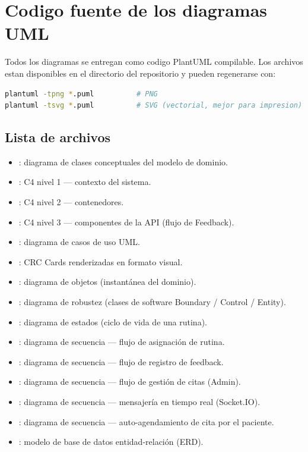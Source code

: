 \chapter{Codigo fuente de los diagramas UML}\label{ch:anexos}

Todos los diagramas se entregan como codigo PlantUML compilable. Los archivos  estan disponibles en el directorio  del repositorio y pueden regenerarse con:

\begin{lstlisting}[language=bash]
plantuml -tpng *.puml          # PNG
plantuml -tsvg *.puml          # SVG (vectorial, mejor para impresion)
\end{lstlisting}

\section{Lista de archivos}

\begin{itemize}
  \item {}: diagrama de clases conceptuales del modelo de dominio.
  \item {}: C4 nivel 1 --- contexto del sistema.
  \item {}: C4 nivel 2 --- contenedores.
  \item {}: C4 nivel 3 --- componentes de la API (flujo de Feedback).
  \item {}: diagrama de casos de uso UML.
  \item {}: CRC Cards renderizadas en formato visual.
  \item {}: diagrama de objetos (instantánea del dominio).
  \item {}: diagrama de robustez (clases de software Boundary / Control / Entity).
  \item {}: diagrama de estados (ciclo de vida de una rutina).
  \item {}: diagrama de secuencia --- flujo de asignación de rutina.
  \item {}: diagrama de secuencia --- flujo de registro de feedback.
  \item {}: diagrama de secuencia --- flujo de gestión de citas (Admin).
  \item {}: diagrama de secuencia --- mensajería en tiempo real (Socket.IO).
  \item {}: diagrama de secuencia --- auto-agendamiento de cita por el paciente.
  \item {}: modelo de base de datos entidad-relación (ERD).
\end{itemize}

